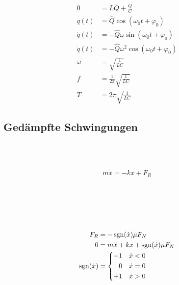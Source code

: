 \begin{boxleft}
\\
\\
\\
\end{boxleft}\begin{boxrightshaded}
\begin{align}
0&=L\ddot{Q}+\frac{Q}{C}\\
q(t)&=\hat{Q}\cos(\omega_0 t+\varphi_0)\\
\dot{q}(t)&=-\hat{Q}\omega\sin(\omega_0 t+\varphi_0)\\
\ddot{q}(t)&=-\hat{Q}\omega^2\cos(\omega_0 t+\varphi_0)\\
\omega&=\sqrt{\frac{1}{LC}}\\
f&=\frac{1}{2\pi}\sqrt{\frac{1}{LC}}\\
T&=2\pi\sqrt{\frac{1}{LC}}
\end{align}
\end{boxrightshaded}

\subsection{Gedämpfte Schwingungen}

\begin{boxleft}
\\
\\
\end{boxleft}\begin{boxrightshaded}
\begin{align}
m\ddot{x}=-kx+F_R
\end{align}
\end{boxrightshaded}

\begin{boxleft}
\\
\\
\\
\\
\end{boxleft}\begin{boxrightshaded}
\begin{align}
F_R&=-\operatorname{sgn}({\dot{x}})\mu F_N\\
0&=m\ddot{x}+kx+\operatorname{sgn}({\dot{x}})\mu F_N\\
\operatorname{sgn}({\dot{x}})&=
\begin{dcases*}
  -1&$\dot{x}<0$\\
\phantom{+}0& $\dot{x}=0$\\
  +1&$\dot{x}>0$
\end{dcases*}
\end{align}
\end{boxrightshaded}

